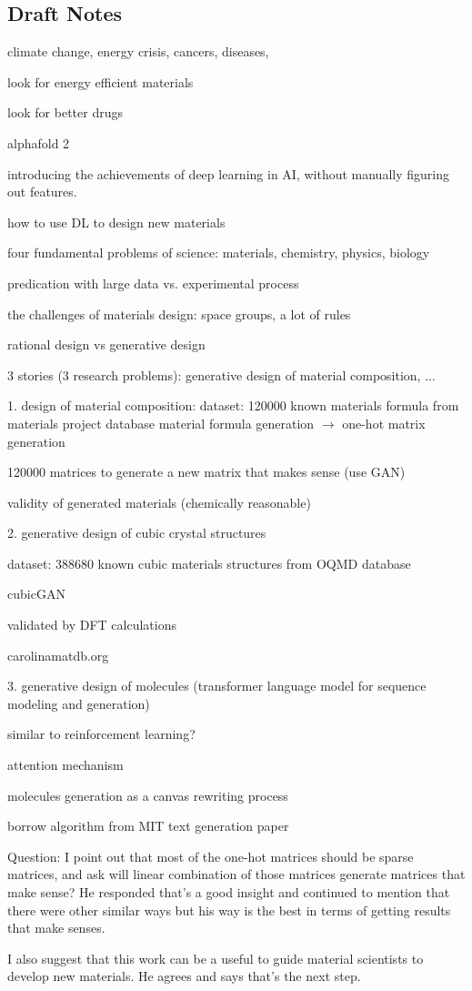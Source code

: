 \documentclass[11pt, oneside]{article}   	%
\begin{document}
\subsection{Draft Notes}
climate change, energy crisis, cancers, diseases, 


look for energy efficient materials

look for better drugs

alphafold 2


introducing the achievements  of deep learning in AI, without manually figuring out features.

how to use DL to design new materials

four fundamental problems of science: materials, chemistry, physics, biology

predication with large data vs. experimental process 


the challenges of materials design: space groups, a lot of rules


rational design vs generative design

3 stories (3 research problems): generative design of material composition, ... 


1. design of material composition: 
dataset: 120000 known materials formula from materials project database
material formula generation $\rightarrow$ one-hot matrix generation

120000 matrices to generate a new matrix that makes sense (use GAN)

validity of generated materials (chemically reasonable)

2. generative design of cubic crystal structures

dataset: 388680 known cubic materials structures from OQMD database

cubicGAN


validated by DFT calculations

carolinamatdb.org

3. generative design of molecules  (transformer language model for sequence modeling and generation)

similar to reinforcement learning?

attention mechanism

molecules generation as a canvas rewriting process

borrow algorithm from MIT text generation paper

 
Question: I point out that most of the one-hot matrices should be sparse matrices, and ask will linear combination of those matrices generate matrices that make sense? He responded that's a good insight and continued to mention that there were other similar ways but his way is the best in terms of getting results that make senses.

I also suggest that this work can be a useful to guide material scientists to develop new materials. He agrees and says that's the next step.




 
\end{document}
